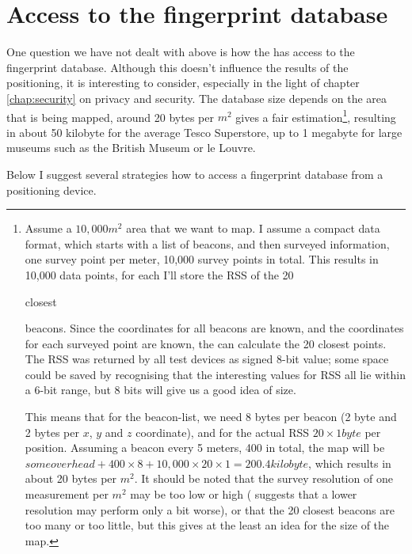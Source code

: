 \section{Access to the fingerprint database}
\label{architecture-database}
One question we have not dealt with above is how the \device has access to the fingerprint database.
Although this doesn't influence the results of the positioning, it is interesting to consider, especially in the light of chapter \ref{chap:security} on privacy and security.
The database size depends on the area that is being mapped, around 20 bytes per $m^2$ gives a fair estimation\footnote{Assume a $10,000m^2$ area that we want to map.
    I assume a compact data format, which starts with a list of beacons, and then surveyed information, one survey point per meter, 10,000 survey points in total.
    This results in 10,000 data points, for each I'll store the RSS of the 20 \begin{em}closest\end{em} beacons.
    Since the coordinates for all beacons are known, and the coordinates for each surveyed point are known, the \device can calculate the 20 closest points.
    The RSS was returned by all test devices as signed 8-bit value; some space could be saved by recognising that the interesting values for RSS all lie within a 6-bit range, but 8 bits will give us a good idea of size.

    This means that for the beacon-list, we need 8 bytes per beacon (2 byte \bid and 2 bytes per $x$, $y$ and $z$ coordinate), and for the actual RSS $20 \times 1 byte$ per position.
    Assuming a beacon every 5 meters, 400 in total, the map will be $some overhead + 400 \times 8 + 10,000 \times 20 \times 1 = 200.4 kilobyte$, which results in about 20 bytes per $m^2$.
    It should be noted that the survey resolution of one measurement per $m^2$ may be too low or high ( suggests that a lower resolution may perform only a bit worse), or that the 20 closest beacons are too many or too little, but this gives at the least an idea for the size of the map.
}, resulting in about 50 kilobyte for the average Tesco Superstore, up to 1 megabyte for large museums such as the British Museum or le Louvre.

Below I suggest several strategies how to access a fingerprint database from a positioning device.

